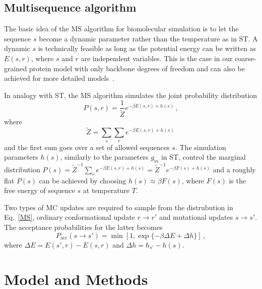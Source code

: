 \documentclass[%
 aip,
rsi,%
 amsmath,amssymb,
 reprint,%
]{revtex4-1}
\newcommand	 {\sbar}	{{s}}
\newcommand	 {\rbar}	{{r}}
\begin{document}
\subsection{Multisequence algorithm}
\noindent 
The basic idea of the MS algorithm for biomolecular simulation is to let the sequence $\sbar$ become a dynamic parameter rather than the temperature as in ST. A dynamic $\sbar$ is technically feasible as long as the potential energy can be written as $E(\sbar,\rbar)$, where $\sbar$ and $\rbar$ are independent variables. This is the case in our coarse-grained protein model with only backbone degrees of freedom and can also be achieved for more detailed  models~\cite{Bhattacherjee2013,Wallin2017}. 

In analogy with ST, the MS algorithm simulates the joint probability distribution
\begin{equation}
P(\sbar,\rbar) =\dfrac{1}{\tilde{Z}}e^{-\beta E(\sbar,\rbar) + h(\sbar)}\,, 
\label{MS}
\end{equation}
where  
\begin{equation}
\tilde{Z} = \sum_{\sbar}\sum_{\rbar} e^{-\beta E(\sbar,\rbar)+ h(\sbar)}\,
\end{equation}
and the first sum goes over a set of allowed sequences $\sbar$. The simulation parameters $h(\sbar)$, similarly to the parameters $g_m$ in ST, control the marginal distribution $P(\sbar)=\tilde{Z}^{-1}\sum_{\rbar} e^{-\beta E(\sbar,\rbar)+ h(\sbar)} = \tilde{Z}^{-1}e^{-\beta F(\sbar)+ h(\sbar)}$ and a roughly flat $P(\sbar)$ can be achieved by choosing $h(\sbar) \approx \beta F(\sbar)$, where $F(\sbar)$ is the free energy of sequence $\sbar$ at temperature $T$. 

Two types of MC updates are required to sample from the distrubution in Eq.~\ref{MS}, ordinary conformational update $\rbar\rightarrow\rbar'$ and mutational updates $\sbar\rightarrow\sbar'$. The acceptance probabilities for the latter  becomes
\begin{equation}
P_\mathrm{acc} (\sbar\rightarrow\sbar') = \min [1, \exp\{-\beta\Delta E+\Delta h\}]\,,
\label{accrej}
\end{equation}
where $\Delta E = E(\sbar',\rbar)-E(\sbar,\rbar)$ and $\Delta h = h_{\sbar'}-h(\sbar)$.

\section{Model and Methods}
\end{document}
